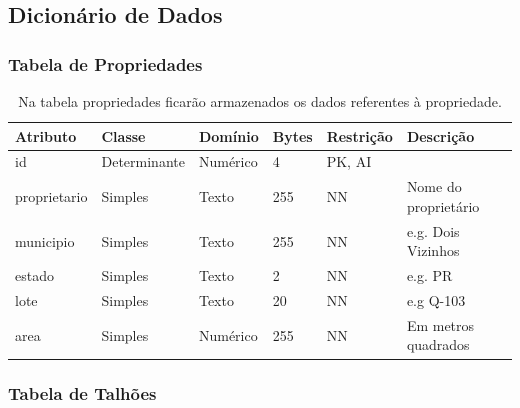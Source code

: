 \subsection{Dicionário de Dados}
\label{sec:titSecDiagERDicionario}

\begin{landscape}
    \subsubsection{Tabela de Propriedades}
    \label{sec:titSubSecPropriedades}

    \begin{table}[H]
        \centering
        \caption[Tabela \textbf{propriedades}]{Na tabela propriedades ficarão armazenados os dados referentes à propriedade.
            \label{tab:tabela-er-propriedades}}
        \begin{tabular}{|p{4cm}|p{3cm}|p{2cm}|p{1cm}|p{2cm}|p{8cm}|}
            \hline
            Atributo     & Classe       & Domínio  & Bytes & Restrição & Descrição            \\\hline
            id           & Determinante & Numérico & 4     & PK, AI    &                      \\\hline
            proprietario & Simples      & Texto    & 255   & NN        & Nome do proprietário \\\hline
            municipio    & Simples      & Texto    & 255   & NN        & e.g. Dois Vizinhos   \\\hline
            estado       & Simples      & Texto    & 2     & NN        & e.g. PR              \\\hline
            lote         & Simples      & Texto    & 20    & NN        & e.g Q-103            \\\hline
            area         & Simples      & Numérico & 255   & NN        & Em metros quadrados  \\\hline
        \end{tabular}
    \end{table}

    \subsubsection{Tabela de Talhões}
    \label{sec:titSubSecTalhoes}


\end{landscape}
